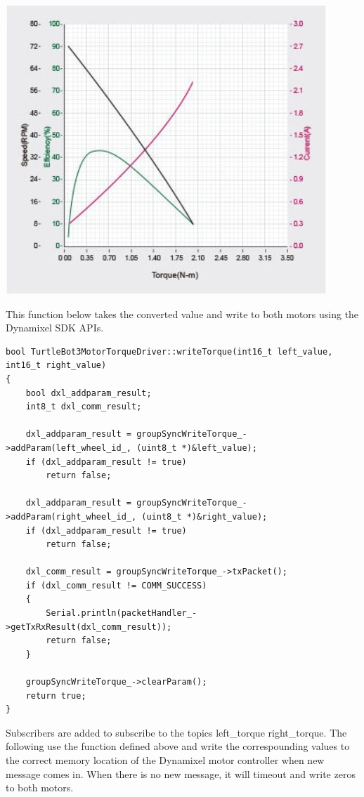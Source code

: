 \documentclass[12]{article}
\begin{document}
\begin{center}
	\includegraphics[width=\linewidth]{images/xm430_performance.png}\\
\end{center}

This function below takes the converted value and write to both motors using the Dynamixel SDK APIs. 

\begin{lstlisting}[style=C++]
bool TurtleBot3MotorTorqueDriver::writeTorque(int16_t left_value, int16_t right_value)
{
    bool dxl_addparam_result;
    int8_t dxl_comm_result;

    dxl_addparam_result = groupSyncWriteTorque_->addParam(left_wheel_id_, (uint8_t *)&left_value);
    if (dxl_addparam_result != true)
        return false;

    dxl_addparam_result = groupSyncWriteTorque_->addParam(right_wheel_id_, (uint8_t *)&right_value);
    if (dxl_addparam_result != true)
        return false;

    dxl_comm_result = groupSyncWriteTorque_->txPacket();
    if (dxl_comm_result != COMM_SUCCESS)
    {
        Serial.println(packetHandler_->getTxRxResult(dxl_comm_result));
        return false;
    }

    groupSyncWriteTorque_->clearParam();
    return true;
}
\end{lstlisting}

Subscribers are added to subscribe to the topics \/left\_torque \/right\_torque. 
The following use the function defined above and write the correspounding values to the correct memory location of the Dynamixel motor controller when new message comes in. When there is no new message, it will timeout and write zeros to both motors. 
\end{document}
